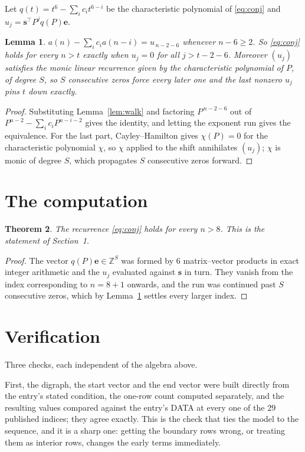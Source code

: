 \documentclass[11pt,a4paper]{article}
\theoremstyle{plain}
\newtheorem{theorem}{Theorem}
\newtheorem{lemma}[theorem]{Lemma}
\theoremstyle{definition}
\begin{document}
Let $q(t)=t^{6}-\sum_i c_i t^{6-i}$ be the characteristic polynomial of
\eqref{eq:conj} and $u_j=\mathbf{s}^{\!\top}P^{j}q(P)\mathbf{e}$.

\begin{lemma}\label{lem:crit}
$a(n)-\sum_i c_i a(n-i)=u_{\,n-2-6}$ whenever $n-6\ge2$. So \eqref{eq:conj}
holds for every $n>t$ exactly when $u_j=0$ for all $j>t-2-6$. Moreover $(u_j)$
satisfies the monic linear recurrence given by the characteristic polynomial of $P$, of
degree $S$, so $S$ consecutive zeros force every later one and the last nonzero $u_j$ pins
$t$ down exactly.
\end{lemma}

\begin{proof}
Substituting Lemma~\ref{lem:walk} and factoring $P^{\,n-2-6}$ out of
$P^{n-2}-\sum_i c_i P^{n-i-2}$ gives the identity, and letting the exponent run gives the
equivalence. For the last part, Cayley--Hamilton gives $\chi(P)=0$ for the characteristic
polynomial $\chi$, so $\chi$ applied to the shift annihilates $(u_j)$; $\chi$ is monic of
degree $S$, which propagates $S$ consecutive zeros forward.
\end{proof}

\section{The computation}

\begin{theorem}
The recurrence \eqref{eq:conj} holds for every $n>8$. This is the statement of
Section~1.
\end{theorem}

\begin{proof}
The vector $q(P)\mathbf{e}\in\mathbb{Z}^{S}$ was formed by $6$ matrix--vector
products in exact integer arithmetic and the $u_j$ evaluated against $\mathbf{s}$ in turn.
They vanish from the index corresponding to $n=8+1$ onwards, and the run was continued
past $S$ consecutive zeros, which by Lemma~\ref{lem:crit} settles every larger index.
\end{proof}

\section{Verification}

Three checks, each independent of the algebra above.

First, the digraph, the start vector and the end vector were built directly from the
entry's stated condition, the one-row count computed separately, and the resulting values
compared against the entry's DATA at every one of the $29$ published indices; they
agree exactly. This is the check that ties the model to the sequence, and it is a sharp one:
getting the boundary rows wrong, or treating them as interior rows, changes the early terms
immediately.
\end{document}
